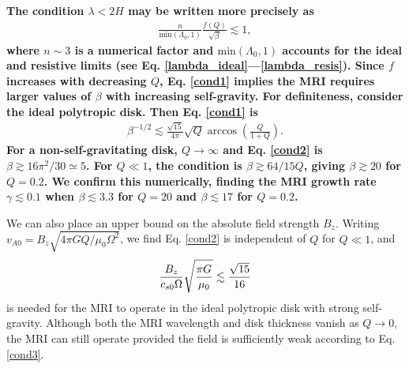 {\bf
  The condition $\lambda < 2H$ 
  may be written more precisely as 
  \begin{align}\label{cond1}
    \frac{n}{\mathrm{min}(\Lambda_0, 1)}\frac{f(Q)}{\sqrt{\beta}} \lesssim 1,
  \end{align}
  where $n\sim 3$ is a numerical factor and
  $\mathrm{min}(\Lambda_0,1)$ accounts for the ideal and resistive
  limits (see Eq. \ref{lambda_ideal}---\ref{lambda_resis}). Since $f$
  increases with decreasing $Q$, Eq. \ref{cond1} implies
  the MRI requires larger values of $\beta$ with  
  increasing self-gravity. 
  For definiteness, consider the ideal polytropic disk. Then Eq. \ref{cond1} is
  \begin{align}\label{cond2}
    \beta^{-1/2} \lesssim
    \frac{\sqrt{15}}{4\pi}\sqrt{Q}\arccos{\left(\frac{Q}{1+Q}\right)}. 
  \end{align}
  For a non-self-gravitating disk, $Q\to\infty$ and Eq. \ref{cond2} is
  $\beta \gtrsim 16\pi^2/30\simeq 5$. For $Q\ll 1$, the condition is
  $\beta \gtrsim 64/15Q$, giving $\beta\gtrsim 20$ for
  $Q=0.2$. We confirm this numerically, finding the MRI growth rate
  $\gamma  \lesssim 0.1$ when $\beta \lesssim 3.3$ for $Q=20$ and 
  $\beta \lesssim 17$ for $Q=0.2$.  

  We can also place an upper bound on the absolute field strength
  $B_z$. Writing $v_{A0} = B_z\sqrt{4\pi G Q/\mu_0\Omega^2}$, we find 
  Eq. \ref{cond2} is independent of $Q$ for $Q\ll1$, and 
  \begin{align}\label{cond3}
    \frac{B_z}{c_{s0}\Omega}\sqrt{\frac{\pi G}{\mu_0}}\lesssim
    \frac{\sqrt{15}}{16}
  \end{align}
  is needed for the MRI to operate in the ideal polytropic disk with strong
  self-gravity. Although both the MRI wavelength and disk thickness
  vanish as $Q\to 0$, the MRI can still operate provided the field is
  sufficiently weak according to Eq. \ref{cond3}.  


}
